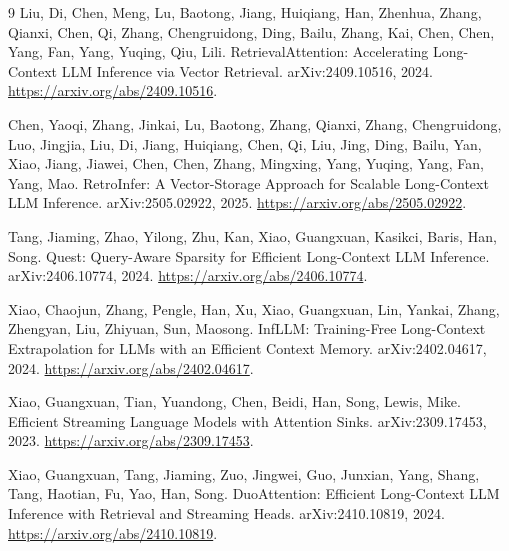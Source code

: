 \begin{thebibliography}{9}
 Liu, Di, Chen, Meng, Lu, Baotong, Jiang, Huiqiang, Han, Zhenhua, Zhang, Qianxi, Chen, Qi, Zhang, Chengruidong, Ding, Bailu, Zhang, Kai, Chen, Chen, Yang, Fan, Yang, Yuqing, Qiu, Lili. RetrievalAttention: Accelerating Long-Context LLM Inference via Vector Retrieval. arXiv:2409.10516, 2024. \url{https://arxiv.org/abs/2409.10516}.

 Chen, Yaoqi, Zhang, Jinkai, Lu, Baotong, Zhang, Qianxi, Zhang, Chengruidong, Luo, Jingjia, Liu, Di, Jiang, Huiqiang, Chen, Qi, Liu, Jing, Ding, Bailu, Yan, Xiao, Jiang, Jiawei, Chen, Chen, Zhang, Mingxing, Yang, Yuqing, Yang, Fan, Yang, Mao. RetroInfer: A Vector-Storage Approach for Scalable Long-Context LLM Inference. arXiv:2505.02922, 2025. \url{https://arxiv.org/abs/2505.02922}.

 Tang, Jiaming, Zhao, Yilong, Zhu, Kan, Xiao, Guangxuan, Kasikci, Baris, Han, Song. Quest: Query-Aware Sparsity for Efficient Long-Context LLM Inference. arXiv:2406.10774, 2024. \url{https://arxiv.org/abs/2406.10774}.

 Xiao, Chaojun, Zhang, Pengle, Han, Xu, Xiao, Guangxuan, Lin, Yankai, Zhang, Zhengyan, Liu, Zhiyuan, Sun, Maosong. InfLLM: Training-Free Long-Context Extrapolation for LLMs with an Efficient Context Memory. arXiv:2402.04617, 2024. \url{https://arxiv.org/abs/2402.04617}.

 Xiao, Guangxuan, Tian, Yuandong, Chen, Beidi, Han, Song, Lewis, Mike. Efficient Streaming Language Models with Attention Sinks. arXiv:2309.17453, 2023. \url{https://arxiv.org/abs/2309.17453}.

 Xiao, Guangxuan, Tang, Jiaming, Zuo, Jingwei, Guo, Junxian, Yang, Shang, Tang, Haotian, Fu, Yao, Han, Song. DuoAttention: Efficient Long-Context LLM Inference with Retrieval and Streaming Heads. arXiv:2410.10819, 2024. \url{https://arxiv.org/abs/2410.10819}.
\end{thebibliography}
